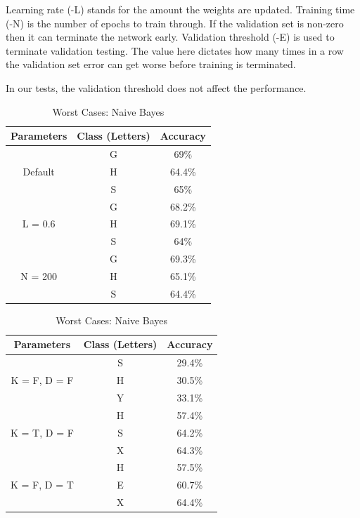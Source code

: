 \documentclass[11pt]{article}
\begin{document}
Learning rate (-L) stands for the amount the weights are updated. Training time (-N) is the number of epochs to train through. If the validation set is non-zero then it can terminate the network early. Validation threshold (-E) is used to terminate validation testing. The value here dictates how many times in a row the validation set error can get worse before training is terminated.

In our tests, the validation threshold does not affect the performance.
 
 \begin{table}[!htb]

\centering
\begin{minipage}{0.46\columnwidth}
\begin{tabular}{c  c  c} \hline

Parameters & Class (Letters) & Accuracy \\\hline
\multirow{3}{*}{Default} & G & 69\% \\
	& H & 64.4\% \\
	& S & 65\% \\\hline
\multirow{3}{*}{L = 0.6} & G & 68.2\% \\
	& H & 69.1\% \\
	& S & 64\% \\\hline
\multirow{3}{*}{N = 200} & G & 69.3\% \\
	& H & 65.1\% \\
	& S & 64.4\% \\\hline
\end{tabular}
\caption{Worst Cases: Multilayer Perceptron} %
\label{tbl:ann}
\end{minipage}
\hfill
\begin{minipage}{0.46\columnwidth}
\begin{tabular}{c  c  c} \hline

Parameters & Class (Letters) & Accuracy \\\hline
\multirow{3}{*}{K = F, D = F} & S & 29.4\% \\
	& H & 30.5\% \\
	& Y & 33.1\% \\\hline
\multirow{3}{*}{K = T, D = F} & H & 57.4\% \\
	& S & 64.2\% \\
	& X & 64.3\% \\\hline
\multirow{3}{*}{K = F, D = T} & H & 57.5\% \\
	& E & 60.7\% \\
	& X & 64.4\% \\\hline
\end{tabular}
\caption{Worst Cases: Naive Bayes} %
\label{tbl:bayes}
\end{minipage}
\end{table}
\end{document}
